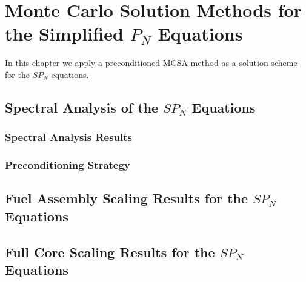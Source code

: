 \chapter{Monte Carlo Solution Methods for the Simplified $P_N$ Equations}
\label{ch:mc_spn_solutions}
In this chapter we apply a preconditioned MCSA method as a solution
scheme for the $SP_N$ equations.

\section{Spectral Analysis of the $SP_N$ Equations}
\label{sec:spn_spectral_analysis}


\subsection{Spectral Analysis Results}
\label{subsec:spn_analysis_results}


\subsection{Preconditioning Strategy}
\label{subsec:spn_preconditioning}


\section{Fuel Assembly Scaling Results for the $SP_N$ Equations}
\label{sec:spn_assembly_scaling}

\section{Full Core Scaling Results for the $SP_N$ Equations}
\label{sec:spn_assembly_scaling}
